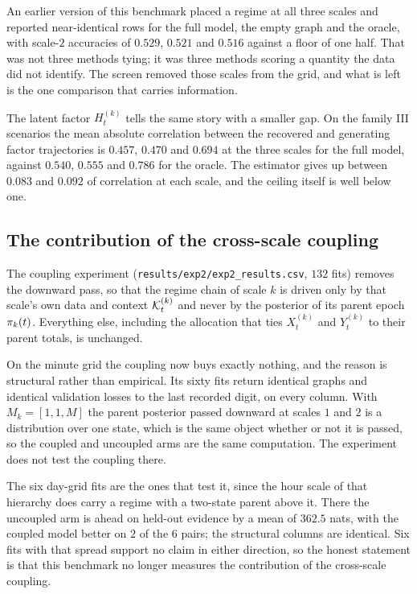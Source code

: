 An earlier version of this benchmark placed a regime at all three scales and
reported near-identical rows for the full model, the empty graph and the oracle,
with scale-$2$ accuracies of $0.529$, $0.521$ and $0.516$ against a floor of one
half. That was not three methods tying; it was three methods scoring a quantity
the data did not identify. The screen removed those scales from the grid, and
what is left is the one comparison that carries information.

The latent factor $H_t^{(k)}$ tells the same story with a smaller gap. On the
family III scenarios the mean absolute correlation between the recovered and
generating factor trajectories is $0.457$, $0.470$ and $0.694$ at the three
scales for the full model, against $0.540$, $0.555$ and $0.786$ for the oracle.
The estimator gives up between $0.083$ and $0.092$ of correlation at each
scale, and the ceiling itself is well below one.

\subsection{The contribution of the cross-scale coupling}
\label{sec:results:coupling}

The coupling experiment (\texttt{results/exp2/exp2\_results.csv}, $132$ fits)
removes the downward pass, so that the regime chain of scale $k$ is driven only
by that scale's own data and context ${\mathcal{K}}_t^{(k)}$ and never by the posterior
of its parent epoch $\pi_k(t)$. Everything else, including the allocation
that ties $X_t^{(k)}$ and $Y_t^{(k)}$ to their parent totals, is unchanged.

On the minute grid the coupling now buys exactly nothing, and the reason is
structural rather than empirical. Its sixty fits return identical graphs and
identical validation losses to the last recorded digit, on every column. With
$M_k = [1,1,M]$ the parent posterior passed downward at scales $1$ and $2$ is a
distribution over one state, which is the same object whether or not it is
passed, so the coupled and uncoupled arms are the same computation. The
experiment does not test the coupling there.

The six day-grid fits are the ones that test it, since the hour scale of that
hierarchy does carry a regime with a two-state parent above it. There the
uncoupled arm is ahead on held-out evidence by a mean of $362.5$ nats, with the
coupled model better on $2$ of the $6$ pairs; the structural columns are
identical. Six fits with that spread support no claim in either direction, so
the honest statement is that this benchmark no longer measures the contribution
of the cross-scale coupling.

